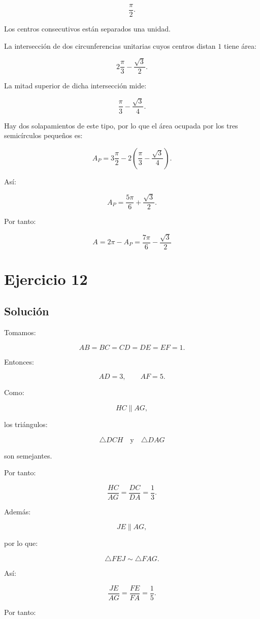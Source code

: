 \documentclass[11pt,a4paper]{article}
\begin{document}
\[
\frac{\pi}{2}.
\]

Los centros consecutivos están separados una unidad.

La intersección de dos circunferencias unitarias cuyos centros distan \(1\) tiene área:

\[
2\frac{\pi}{3}
-
\frac{\sqrt3}{2}.
\]

La mitad superior de dicha intersección mide:

\[
\frac{\pi}{3}
-
\frac{\sqrt3}{4}.
\]

Hay dos solapamientos de este tipo, por lo que el área ocupada por los tres semicírculos pequeños es:

\[
A_P
=
3\frac{\pi}{2}
-
2\left(
\frac{\pi}{3}
-
\frac{\sqrt3}{4}
\right).
\]

Así:

\[
A_P
=
\frac{5\pi}{6}
+
\frac{\sqrt3}{2}.
\]

Por tanto:

\[
\boxed{
A
=
2\pi-A_P
=
\frac{7\pi}{6}
-
\frac{\sqrt3}{2}
}
\]

\section{Ejercicio 12}
\subsection{Solución}

Tomamos:

\[
AB=BC=CD=DE=EF=1.
\]

Entonces:

\[
AD=3,
\qquad
AF=5.
\]

Como:

\[
HC\parallel AG,
\]

los triángulos:

\[
\triangle DCH
\quad\text{y}\quad
\triangle DAG
\]

son semejantes.

Por tanto:

\[
\frac{HC}{AG}
=
\frac{DC}{DA}
=
\frac13.
\]

Además:

\[
JE\parallel AG,
\]

por lo que:

\[
\triangle FEJ
\sim
\triangle FAG.
\]

Así:

\[
\frac{JE}{AG}
=
\frac{FE}{FA}
=
\frac15.
\]

Por tanto:
\end{document}

